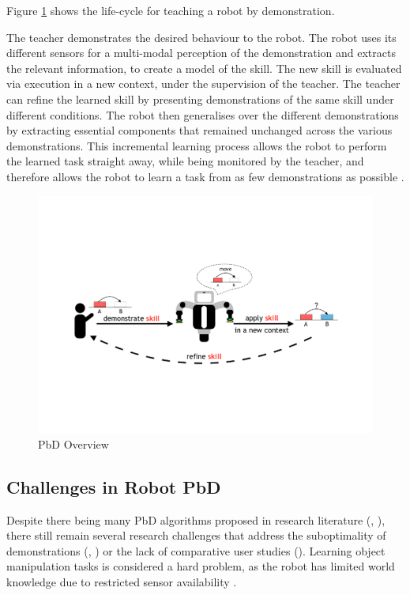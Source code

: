 Figure \ref{fig:Principle Overview} shows the life-cycle for teaching a robot by demonstration.

The teacher demonstrates the desired behaviour to the robot.
The robot uses its different sensors for a multi-modal perception of the demonstration and extracts the relevant information, to create a model of the skill.
The new skill is evaluated via execution in a new context, under the supervision of the teacher.
The teacher can refine the learned skill by presenting demonstrations of the same skill under different conditions.
The robot then generalises over the different demonstrations by extracting essential components that remained unchanged across the various demonstrations.
This incremental learning process allows the robot to perform the learned task straight away, while being monitored by the teacher, and therefore allows the robot to learn a task from as few demonstrations as possible \cite{billard2008robot}.


  \begin{figure}[h]
    \centering
    \includegraphics[scale=0.7]{figures/PbD-Overview}
    \caption{PbD Overview}
    \label{fig:Principle Overview}
  \end{figure}



\subsection{Challenges in Robot PbD}
Despite there being many PbD algorithms proposed in research literature (\cite{argall2009survey}, \cite{billing2010formalism}), there still remain several research challenges that address the suboptimality of demonstrations (\cite{chen2003programing}, \cite{kaiser1995obtaining}) or the lack of comparative user studies (\cite{suay2012practical}).
Learning object manipulation tasks is considered a hard problem, as the robot has limited world knowledge due to restricted sensor availability \cite{ekvall2008robot}.

